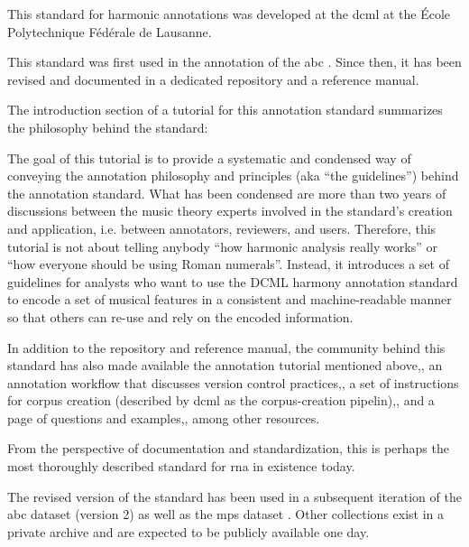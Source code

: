 

This standard for harmonic annotations was developed at the
\gls{dcml} at the \'Ecole Polytechnique F\'ed\'erale de
Lausanne.

This standard was first used in the annotation of the
\gls{abc}
\parencite{neuwirth2018annotated}. Since then, it has been
revised and documented in a dedicated
repository
and a reference
manual.

The introduction section of a tutorial for this annotation
standard summarizes the philosophy behind the standard:

\begin{italicquote}
    The goal of this tutorial is to provide a systematic and
    condensed way of conveying the annotation philosophy and
    principles (aka “the guidelines”) behind the annotation
    standard. What has been condensed are more than two
    years of discussions between the music theory experts
    involved in the standard's creation and application,
    i.e. between annotators, reviewers, and users.
    Therefore, this tutorial is not about telling anybody
    “how harmonic analysis really works” or “how everyone
    should be using Roman numerals”. Instead, it introduces
    a set of guidelines for analysts who want to use the
    DCML harmony annotation standard to encode a set of
    musical features in a consistent and machine-readable
    manner so that others can re-use and rely on the encoded
    information.
\end{italicquote}

In addition to the repository and reference manual, the
community behind this standard has also made available the
annotation tutorial mentioned
above,,
an annotation workflow that discusses version control
practices,,
a set of instructions for corpus creation (described by
\gls{dcml} as the corpus-creation
pipelin),,
and a page of questions and
examples,,
among other resources.


From the perspective of documentation and standardization,
this is perhaps the most thoroughly described standard for
\gls{rna} in existence today.

The revised version of the standard has been used in a
subsequent iteration of the \gls{abc} dataset (version 2) as
well as the \gls{mps} dataset
\parencite{hentschel2021annotated}. Other collections exist
in a private archive and are expected to be publicly
available one day.
